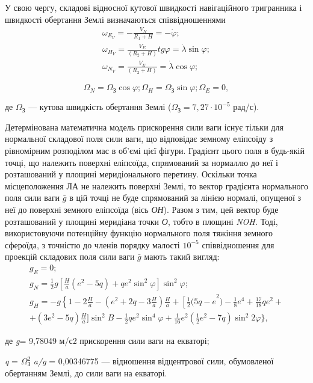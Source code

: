 У свою чергу, складові відносної кутової швидкості навігаційного тригранника і швидкості 
обертання Землі визначаються співвідношеннями
\[\begin{array}{l} 
{\omega_{E_{V}} =-\frac{V_{N} }{R_{1} +H} =-\dot{\varphi};} \\ 
{\omega_{H_{V}} =\frac{V_{E}}{(R_{2} +H)} tg\varphi=\dot{\lambda}\sin \varphi;} \\ 
{\omega_{N_{V}} =\frac{V_{E} }{(R_{2} +H)} =\dot{\lambda}\cos \varphi;} \end{array}\] 

\[\Omega_{N} =\Omega_{\text{З}}\cos \varphi;
\Omega_{H} =\Omega_{\text{З}}\sin \varphi; 
\Omega_{E} =0,\] 

\begin{ESKDexplanation}
 \item де  $\Omega_{\text{З}} $ --- кутова швидкість обертання Землі ($\Omega_{\text{З}}=7,27 \cdot 10^{-5}$ рад/с).
\end{ESKDexplanation}

Детермінована математична модель прискорення сили ваги існує тільки для нормальної 
складової поля сили ваги, що відповідає земному еліпсоїду з рівномірним розподілом 
мас в об'ємі цієї фігури. Градієнт цього поля в будь-якій точці, що належить поверхні 
еліпсоїда, спрямований за нормаллю до неї і розташований у площині меридіонального 
перетину. Оскільки точка місцеположення ЛА не належить поверхні Землі, то вектор 
градієнта нормального поля сили ваги $\bar{g}$ в цій точці не буде спрямований за 
лінією нормалі, опущеної з неї до поверхні земного еліпсоїда (вісь \textit{ОН}). 
Разом з тим, цей вектор буде розташований у площині меридіана точки \textit{О}, тобто 
в площині \textit{NOH. }Тоді, використовуючи  потенційну функцію нормального поля 
тяжіння земного сфероїда, з точністю до членів порядку малості $10^{-5}$  співвідношення 
для проекцій складових поля сили ваги $\bar{g}$ мають такий вигляд:
\[\begin{array}{l} 
{g_{E} =0;} \\
{g_{N} =\frac{1}{2} g[\frac{H}{a} (e^{2} -5q)+qe^{2} \sin^{2}\varphi]\sin^2\varphi;}\\
{g_{H} =-g\left\{1-2\frac{H}{a} -\right. (e^{2} +2q-3\frac{H}{a})
\frac{H}{a} +\left[\frac{1}{2} (5q-e\right. ^{2} )-\frac{1}{8} e^{4} +\frac{17}{18}qe^{2} +} \\ 
{ +(3e^{2} - 5q)\frac{H}{a} ]\sin ^{2} B-\frac{1}{2} qe^{2} \sin ^{4} \varphi+\frac{1}{16} e^{2} 
(\frac{1}{2} e^{2} -7q)\sin ^{2} 2\varphi\},} 
\end{array}\]
\begin{ESKDexplanation}
\item де \textit{g}= 9,78049 м/с2 прискорення сили ваги на екваторі; 
\item \textit{q} = $\Omega_{\text{З}}^{2} $ \textit{a/g} = 0,00346775 --- відношення 
відцентрової сили, обумовленої обертанням Землі, до сили ваги на екваторі. 
\end{ESKDexplanation}

